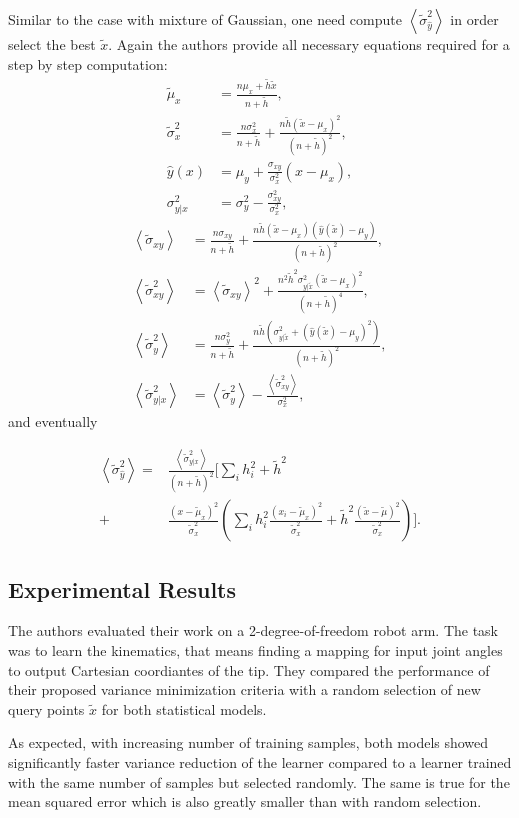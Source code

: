 \documentclass{article}
\newcommand{\xt}{\tilde{x}}
\newcommand{\hht}{\tilde{h}}
\newcommand{\st}{\tilde{\sigma}}
\newcommand{\mut}{\tilde{\mu}}
\newcommand{\E}[1]{\left< #1 \right>}
\newcommand{\sn}{\left< \tilde{\sigma}_{\hat{y}}^2 \right>}
\begin{document}
Similar to the case with mixture of Gaussian, one need compute $\sn$ in order
select the best $\xt$. Again the authors provide all necessary equations
required for a step by step computation:
\[\begin{split}
\mut_x &= \frac{n\mu_x+\hht\xt}{n+\hht},\\
\st_{x}^2 &= \frac{n\sigma_{x}^2}{n+\hht} + \frac{n \hht (\xt-\mu_{x})^2}{(n+\hht)^2},\\
\hat{y}(x) &= \mu_{y} + \frac{\sigma_{xy}}{\sigma_{x}^2}(x-\mu_{x}),\\
\sigma_{y|x}^2 &= \sigma_{y}^2 - \frac{\sigma_{xy}^2}{\sigma_{x}^2},
\end{split}\]
\[\begin{split}
\E{\st_{xy}} &= \frac{n\sigma_{xy}}{n+\hht} +
  \frac{n \hht (\xt-\mu_{x})(\hat{y}(\xt)-\mu_{y})}{(n+\hht)^2},\\
\E{\st_{xy}^2} &= \E{\st_{xy}}^2 +
  \frac{n^2\hht^2\sigma_{y|\xt}^2(\xt-\mu_{x})^2}{(n+\hht)^4},\\
\E{\st_{y}^2} &= \frac{n\sigma_{y}^2}{n+\hht} +
  \frac{n\hht \left( \sigma_{y|\xt}^2 + (\hat{y}(\xt)-\mu_{y})^2 \right)}
  {(n+\hht)^2}, \\
\E{\st_{y|x}^2} &= \E{\st_{y}^2} - \frac{\E{\st_{xy}^2}}{\sigma_{x}^2},
\end{split}\]
and eventually
\begin{small}
\begin{equation}\begin{split}
\E{\st_{\hat{y}}^2} =& \frac{\E{\st_{y|x}^2}}{(n+\hht)^2} \bigg[ \sum_i h_i^2 + \hht^2 \\
  +& \frac{(x-\mut_x)^2}{\st_x^2} \left( \sum_i h_i^2 \frac{(x_i - \mut_x)^2}{\st_x^2} +
    \hht^2 \frac{(\xt-\mut)^2}{\st_x^2} \right) \bigg].
\end{split}\end{equation}
\end{small}
\subsection{Experimental Results}
The authors evaluated their work on a 2-degree-of-freedom robot arm. The task
was to learn the kinematics, that means finding a mapping for input joint angles
to output Cartesian coordiantes of the tip. They compared the performance of
their proposed variance minimization criteria with a random selection of new
query points $\xt$ for both statistical models.

As expected, with increasing number of training samples, both models
showed significantly faster variance reduction of the
learner compared to a learner trained with the same number of samples but
selected randomly.
The same is true for the mean squared error which is also greatly smaller
than with random selection.
\end{document}
